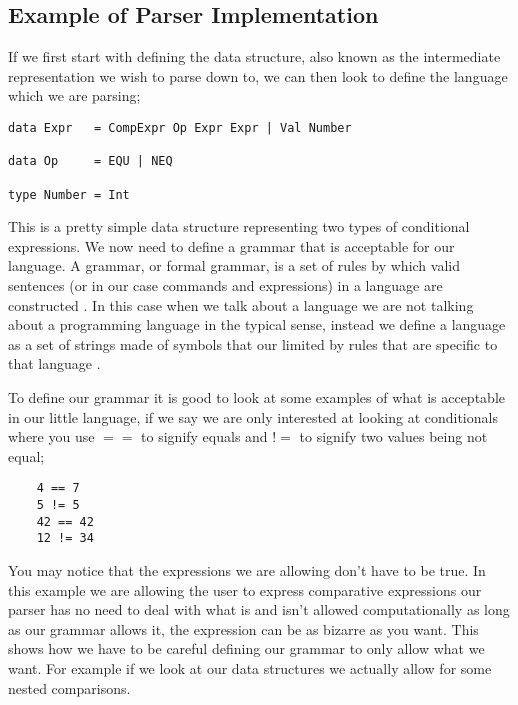\newpage

\subsection{Example of Parser Implementation}

If we first start with defining the data structure, also known as the intermediate representation we wish to parse down to, we can then look to define the language which we are parsing;

\begin{lstlisting}
data Expr 	= CompExpr Op Expr Expr | Val Number
	
data Op		= EQU | NEQ 
	
type Number	= Int 
\end{lstlisting}

This is a pretty simple data structure representing two types of conditional expressions. We now need to define a grammar that is acceptable for our language. A grammar, or formal grammar, is a set of rules by which valid sentences (or in our case commands and expressions) in a language are constructed \footnotemark[1].  In this case when we talk about a language we are not talking about a programming language in the typical sense, instead we define a language as a set of strings made of symbols that our limited by rules that are specific to that language \footnotemark[2]. 


To define our grammar it is good to look at some examples of what is acceptable in our little language, if we say we are only interested at looking at conditionals where you use $==$ to signify equals and $!=$ to signify two values being not equal;

\begin{lstlisting}
	4 == 7
	5 != 5
	42 == 42
	12 != 34 
\end{lstlisting}

You may notice that the expressions we are allowing don't have to be true. In this example we are allowing the user to express comparative expressions our parser has no need to deal with what is and isn't allowed computationally as long as our grammar allows it, the expression can be as bizarre as you want. This shows how we have to be careful defining our grammar to only allow what we want. For example if we look at our data structures we actually allow for some nested comparisons.

